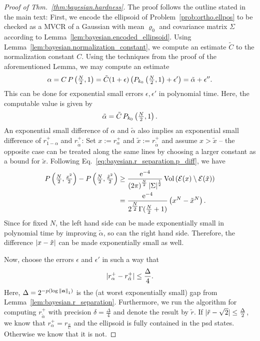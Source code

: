 \begin{proof}[Proof of Thm.~\ref{thm:bayesian.hardness}]
  The proof follows the outline stated in the main text:
  First, we encode the ellipsoid of Problem~\ref{prob:ortho.ellpos} to be checked as a MVCR of a Gaussian with mean $\varrho_0$ and covariance matrix $\Sigma$ according to Lemma~\ref{lem:bayesian.encoded_ellipsoid}.
  Using Lemma~\ref{lem:bayesian.normalization_constant}, we compute an estimate $\tilde C$ to the normalization constant $C$.
  Using the techniques from the proof of the aforementioned Lemma, we may compute an estimate
  \[
    \alpha = C \, P\left( \tfrac{N}{2}, 1 \right) = \tilde C (1 + \epsilon) \left( P_{k_0}\left( \tfrac{N}{2}, 1 \right) + \epsilon' \right) = \tilde\alpha + \epsilon''.
  \]
  This can be done for exponential small errors $\epsilon, \epsilon'$ in polynomial time.
  Here, the computable value is given by
  \[
    \tilde\alpha = \tilde C \, P_{k_0}\left(\tfrac{N}{2}, 1 \right).
  \]
  An exponential small difference of $\alpha$ and $\tilde\alpha$ also implies an exponential small difference of $r^+_{1-\alpha}$ and $r^+_{\tilde\alpha}$:
  Set $x := r^+_{\alpha}$ and $\tilde x := r^+_{\tilde\alpha}$ and assume $x > \tilde x$ -- the opposite case can be treated along the same lines by choosing a larger constant as a bound for $\tilde x$.
  Following Eq.~\eqref{eq:bayesian.r_separation.p_diff}, we have
  \begin{align*}
    P\left( \tfrac{N}{2}, \tfrac{x^2}{2} \right) - P\left( \tfrac{N}{2}, \tfrac{{\tilde x}^2}{2} \right)
    &\ge \frac{\mathrm{e}^{-4}}{{(2\pi)}^{\frac{N}{2}} \, {\vert\Sigma\vert}^{\frac{1}{2}}} \, \mathrm{Vol}\left(  \mathcal{E}(x) \setminus \mathcal{E}(\tilde x)  \right) \\
    &= \frac{\mathrm{e}^{-4}}{2^{\tfrac{N}{2}} \Gamma(\tfrac{N}{2} + 1)} \left( x^N - {\tilde x}^N \right).
  \end{align*}
  Since for fixed $N$, the left hand side can be made exponentially small in polynomial time by improving $\tilde\alpha$, so can the right hand side.
  Therefore, the difference ${\vert x - \tilde x\vert}$ can be made exponentially small as well.


  Now, choose the errors $\epsilon$ and $\epsilon'$ in such a way that
  \[
    {\vert r^+_{\alpha} - r^+_{\tilde\alpha}\vert} \le \frac{\Delta}{4}.
  \]
  Here, $\Delta = 2^{-p(\log {\Vert{\boldsymbol{a}}\Vert}_1)}$ is the (at worst exponentially small) gap from Lemma~\ref{lem:bayesian.r_separation}.
  Furthermore, we run the algorithm for computing $r^+_{\tilde\alpha}$ with precision $\delta = \frac{\Delta}{4}$ and denote the result by $\tilde r$.
  If ${\vert\tilde r - \sqrt{2}\vert} \le \frac{\Delta}{2}$, we know that $r^+_{\alpha} = r_\frac{\alpha}{C}$ and the ellipsoid is fully contained in the psd states.
  Otherwise we know that it is not.
\end{proof}
